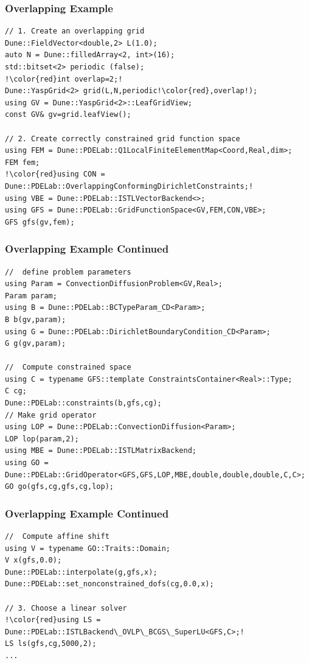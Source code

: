 \documentclass[aspectratio=169,11pt]{beamer}
\theoremstyle{definition}
\begin{document}
\begin{frame}[fragile]
  \frametitle{Overlapping Example}
  \begin{lstlisting}[breaklines=true,escapechar=!]
// 1. Create an overlapping grid
Dune::FieldVector<double,2> L(1.0);
auto N = Dune::filledArray<2, int>(16);
std::bitset<2> periodic (false);
!\color{red}int overlap=2;!
Dune::YaspGrid<2> grid(L,N,periodic!\color{red},overlap!);
using GV = Dune::YaspGrid<2>::LeafGridView;
const GV& gv=grid.leafView();

// 2. Create correctly constrained grid function space
using FEM = Dune::PDELab::Q1LocalFiniteElementMap<Coord,Real,dim>;
FEM fem;
!\color{red}using CON = Dune::PDELab::OverlappingConformingDirichletConstraints;!
using VBE = Dune::PDELab::ISTLVectorBackend<>;
using GFS = Dune::PDELab::GridFunctionSpace<GV,FEM,CON,VBE>;
GFS gfs(gv,fem);
\end{lstlisting}
\end{frame}
\begin{frame}[fragile]
\frametitle<presentation>{Overlapping Example Continued}
  \begin{lstlisting}[breaklines=true]
//  define problem parameters
using Param = ConvectionDiffusionProblem<GV,Real>;
Param param;
using B = Dune::PDELab::BCTypeParam_CD<Param>;
B b(gv,param);
using G = Dune::PDELab::DirichletBoundaryCondition_CD<Param>;
G g(gv,param);

//  Compute constrained space
using C = typename GFS::template ConstraintsContainer<Real>::Type;
C cg;
Dune::PDELab::constraints(b,gfs,cg);
// Make grid operator
using LOP = Dune::PDELab::ConvectionDiffusion<Param>;
LOP lop(param,2);
using MBE = Dune::PDELab::ISTLMatrixBackend;
using GO = Dune::PDELab::GridOperator<GFS,GFS,LOP,MBE,double,double,double,C,C>;
GO go(gfs,cg,gfs,cg,lop);
\end{lstlisting}
\end{frame}
\begin{frame}[fragile]
\frametitle<presentation>{Overlapping Example Continued}
  \begin{lstlisting}[breaklines=true,escapechar=!]
//  Compute affine shift
using V = typename GO::Traits::Domain;
V x(gfs,0.0);
Dune::PDELab::interpolate(g,gfs,x);
Dune::PDELab::set_nonconstrained_dofs(cg,0.0,x);

// 3. Choose a linear solver
!\color{red}using LS = Dune::PDELab::ISTLBackend\_OVLP\_BCGS\_SuperLU<GFS,C>;!
LS ls(gfs,cg,5000,2);
...
\end{lstlisting}
\end{frame}
\end{document}
